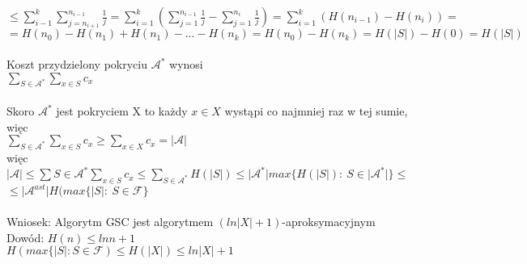 $\leq \sum_{i-1}^{k}\sum_{j=n_{i+1}}^{n_{i-1}}\frac{1}{j}=\sum_{i=1}^{k}(\sum_{j=1}^{n_{i-1}} \frac{1}{j}- \sum_{j=1}^{n_i} \frac{1}{j}) = \sum_{i=1}^{k} (H(n_{i-1}) - H(n_i)) = $\\
$ = H(n_0) - H(n_1) + H(n_1) - ... - H(n_k) = H(n_0) - H(n_k) = H(\vert S\vert ) - H(0) = H(\vert S\vert )$\\\\
Koszt przydzielony pokryciu $\mathcal{A}^{\ast}$ wynosi \\
\tab $\sum_{S\in \mathcal{A}^{\ast}}\sum_{x\in S}c_x$\\\\
Skoro $\mathcal{A}^{\ast}$ jest pokryciem X to każdy $x \in X$ wystąpi co najmniej raz w tej sumie,\\
więc\\
\tab $\sum_{S\in \mathcal{A}^{\ast}}\sum_{x\in S}c_x \geq \sum_{x\in X}c_x = \vert \mathcal{A}\vert$\\
więc\\
\tab $\vert \mathcal{A}\vert \leq \sum{S\in \mathcal{A}^{\ast}}\sum_{x\in S}c_x \leq \sum_{S\in \mathcal{A}^{\ast}}H(\vert S\vert )\leq \vert \mathcal{A}^{\ast}\vert max\lbrace H(\vert S\vert):\ S\in \vert \mathcal{A}^{\ast}\vert\rbrace\leq$\\
\tab $\leq\vert\mathcal{A}^{ast}\vert H(max\lbrace\vert S\vert :\ S\in \mathcal{F}\rbrace$\\\\
Wniosek: Algorytm GSC jest algorytmem $(ln\vert X \vert + 1)$-aproksymacyjnym\\
Dowód: $H(n)\leq lnn+1$\\
\tab $H(max\lbrace\vert S\vert :S\in \mathcal{F})\leq H(\vert X\vert )\leq ln\vert X\vert + 1$